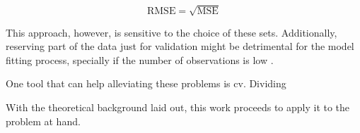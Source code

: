 \begin{equation} 
	\label{eqn:rmse}
	\text{RMSE} = \sqrt{\text{MSE}}
\end{equation}
 
This approach, however,  is sensitive to the choice of these sets. Additionally, reserving part of the data just for validation might be detrimental for the model fitting process, specially if the number of observations is low \parencite{james2013introduction}.

One tool that can help alleviating these problems is \acrfull{cv}. Dividing

With the theoretical background laid out, this work proceeds to apply it to the problem at hand.




